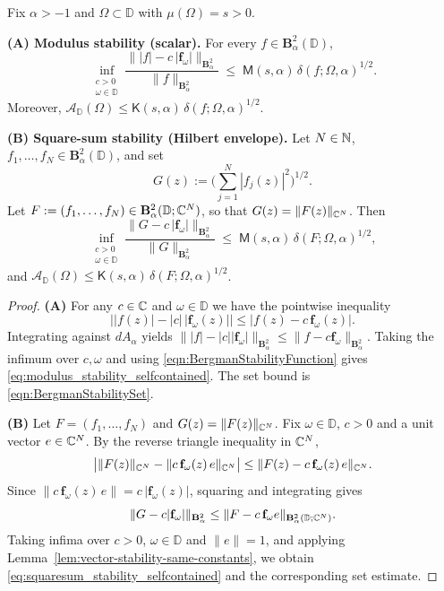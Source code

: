 \documentclass[a4paper,10pt]{amsart}
\newcommand{\D}{\mathbb{D}}
\newcommand{\Berg}{\mathbf{B}_{\alpha}^2}
\begin{document}
\begin{numcor}\label{cor:modulus_and_logsubharmonic_stability_selfcontained}
Fix $\alpha>-1$ and $\Omega\subset\D$ with $\mu(\Omega)=s>0$.

\smallskip
\noindent\textbf{(A) Modulus stability (scalar).}
For every $f\in \mathbf B_\alpha^2(\D)$,
\begin{equation}\label{eq:modulus_stability_selfcontained}
\inf_{\substack{c>0\\ \omega\in\D}}
\frac{\big\||f|-c\,|\mathbf f_{\omega}|\big\|_{\Berg}}{\|f\|_{\Berg}}
\;\le\;
\mathsf M(s,\alpha)\,\delta(f;\Omega,\alpha)^{1/2}.
\end{equation}
Moreover, $\mathcal A_{\D}(\Omega)\le \mathsf K(s,\alpha)\,\delta(f;\Omega,\alpha)^{1/2}$.

\smallskip
\noindent\textbf{(B) Square-sum stability (Hilbert envelope).}
Let $N\in\mathbb{N}$, $f_1,\dots,f_N\in \mathbf B_\alpha^2(\D)$, and set
\[
G(z):=\Big(\sum_{j=1}^N |f_j(z)|^2\Big)^{1/2}.
\]
Let $F:=(f_1,\dots,f_N)\in \mathbf B_\alpha^2(\D;\C^N)$, so that $G(z)=\|F(z)\|_{\mathbb{C}^N}$.
Then
\begin{equation}\label{eq:squaresum_stability_selfcontained}
\inf_{\substack{c>0\\ \omega\in\D}}
\frac{\|G-c\,|\mathbf f_{\omega}|\|_{\Berg}}{\|G\|_{\Berg}}
\;\le\;
\mathsf M(s,\alpha)\,\delta(F;\Omega,\alpha)^{1/2},
\end{equation}
and $\mathcal A_{\D}(\Omega)\le \mathsf K(s,\alpha)\,\delta(F;\Omega,\alpha)^{1/2}$.

\end{numcor}
\begin{proof}
\textbf{(A)} For any $c\in\mathbb{C}$ and $\omega\in\D$ we have the pointwise inequality
\[
\big||f(z)|-|c|\,|\mathbf f_\omega(z)|\big|
\le |f(z)-c\,\mathbf f_\omega(z)|.
\]
Integrating against $dA_\alpha$ yields
$\||f|-|c||\mathbf f_\omega|\|_{\Berg}\le \|f-c\mathbf f_\omega\|_{\Berg}$.
Taking the infimum over $c,\omega$ and using \eqref{eqn:BergmanStabilityFunction} gives
\eqref{eq:modulus_stability_selfcontained}. The set bound is \eqref{eqn:BergmanStabilitySet}.

\smallskip
\textbf{(B)} Let $F=(f_1,\dots,f_N)$ and $G(z)=\|F(z)\|_{\mathbb{C}^N}$.
Fix $\omega\in\D$, $c>0$ and a unit vector $e\in\mathbb{C}^N$.
By the reverse triangle inequality in $\mathbb{C}^N$,
\[
\big|\|F(z)\|_{\mathbb{C}^N}-\|c\,\mathbf f_\omega(z)\,e\|_{\mathbb{C}^N}\big|
\le \|F(z)-c\,\mathbf f_\omega(z)\,e\|_{\mathbb{C}^N}.
\]
Since $\|c\,\mathbf f_\omega(z)\,e\|=c\,|\mathbf f_\omega(z)|$, squaring and integrating gives
\[
\|G-c|\mathbf f_\omega|\|_{\Berg}
\le \|F-c\,\mathbf f_\omega e\|_{\mathbf B_\alpha^2(\D;\C^N)}.
\]
Taking infima over $c>0$, $\omega\in\D$ and $\|e\|=1$, and applying Lemma~\ref{lem:vector-stability-same-constants},
we obtain \eqref{eq:squaresum_stability_selfcontained} and the corresponding set estimate.

\end{proof}
\end{document}
